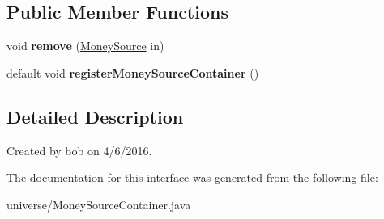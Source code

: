 \subsection*{Public Member Functions}
\begin{DoxyCompactItemize}
\item 
void {\bfseries remove} (\hyperlink{classuniverse_1_1_money_source}{Money\+Source} in)\hypertarget{interfaceuniverse_1_1_money_source_container_a1e2290d65fec503ccf75ef6ad2b3c148}{}\label{interfaceuniverse_1_1_money_source_container_a1e2290d65fec503ccf75ef6ad2b3c148}

\item 
default void {\bfseries register\+Money\+Source\+Container} ()\hypertarget{interfaceuniverse_1_1_money_source_container_a34faa819028174fe33503979109cde95}{}\label{interfaceuniverse_1_1_money_source_container_a34faa819028174fe33503979109cde95}

\end{DoxyCompactItemize}


\subsection{Detailed Description}
Created by bob on 4/6/2016. 

The documentation for this interface was generated from the following file\+:\begin{DoxyCompactItemize}
\item 
universe/Money\+Source\+Container.\+java\end{DoxyCompactItemize}
